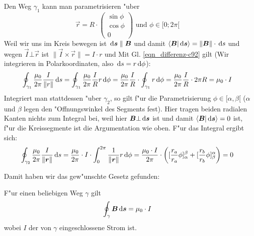 Den Weg $\gamma_1$ kann man parametrisieren "uber
\begin{equation*}
   \vec r = R \cdot
   \begin{pmatrix}
      \sin \phi\\\cos\phi\\0
   \end{pmatrix} \text{ und } \phi \in [0;2\pi[
\end{equation*}
Weil wir uns im Kreis bewegen ist $\, \mathrm{d} \boldsymbol{s} \parallel \boldsymbol{B}$ und damit
$\langle \boldsymbol{B} | \, \mathrm{d} \boldsymbol{s} \rangle = \|\boldsymbol{B}\| \cdot \, \mathrm{d} s$ und wegen
$\vec I \bot \vec r$ ist $\|\vec I \times \vec r\| = I \cdot r$ und Mit
Gl. \eqref{eqn_differenz-c92} gilt (Wir integrieren in Polarkoordinaten, also
$\, \mathrm{d} s = r \, \mathrm{d} \phi$):
\begin{equation}
   \label{eqn_differenz-c96}
   \oint_{\gamma_1} \frac{\mu_0}{2\pi} \frac{I}{\|r\|} \, \mathrm{d} s =
   \oint_{\gamma_1} \frac{\mu_0}{2\pi} \frac{I}{R} r\, \mathrm{d} \phi =
   \frac{\mu_0}{2\pi} \frac{I}{R}  \cdot \oint_{\gamma_1} r \, \mathrm{d} \phi =
   \frac{\mu_0}{2\pi} \frac{I}{R} \cdot 2\pi R = \mu_0 \cdot I
\end{equation}
Integriert man stattdessen "uber $\gamma_2$, so gilt f"ur die
Parametrisierung $\phi \in [\alpha,\beta[$ ($\alpha$ und $\beta$ legen
den "Offnungswinkel des Segments fest). Hier tragen beiden radialen
Kanten nichts zum Integral bei, weil hier $\boldsymbol{B} \bot \, \mathrm{d} \boldsymbol{s}$
ist und damit $\langle \boldsymbol{B} | \, \mathrm{d} \boldsymbol{s} \rangle = 0$ ist, f"ur die
Kreissegmente ist die Argumentation wie oben.
 F"ur das Integral ergibt
sich:
\begin{equation}
   \label{eqn_differenz-c97}
   \oint_{\gamma_2} \frac{\mu_0}{2\pi} \frac{I}{\|\boldsymbol{r}\|} \, \mathrm{d} s =
\frac{\mu_0}{2\pi} \cdot I \cdot   \int_0^{2\pi} \frac 1 {\|\boldsymbol{r}\|} r\, \mathrm{d} \phi =
\frac{\mu_0 \cdot I}{2 \pi} \cdot \left (
[\frac{r_a}{r_a} \phi ]_\alpha^\beta + [\frac{r_b}{r_b} \phi
]^\alpha_\beta \right ) = 0
\end{equation}

Damit haben wir das gew"unschte Gesetz gefunden:
\begin{Wichtig}
    F"ur einen beliebigen Weg $\gamma$
   gilt
   \begin{equation}
      \label{eqn_gesetz_ampere}
      \oint_\gamma \boldsymbol{B} \, \mathrm{d} \boldsymbol{s} = \mu_0 \cdot I
   \end{equation}
wobei $I$ der von $\gamma$ eingeschlossene Strom ist.
\end{Wichtig}

